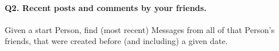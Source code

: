 \paragraph{\textbf{Q2}. Recent posts and comments by your friends.}
Given a start Person, find (most recent) Messages from all of that
Person's friends, that were created before (and including) a given date.
